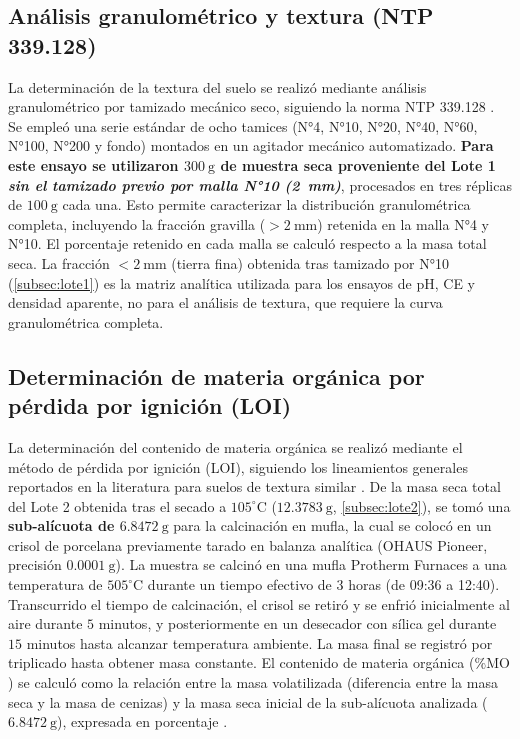 \documentclass[fleqn]{jaes}
\begin{document}
\subsection{Análisis granulométrico y textura (NTP 339.128)}\label{subsec:textura_metodologia}

La determinación de la textura del suelo se realizó mediante análisis granulométrico por tamizado mecánico seco, siguiendo la norma NTP 339.128 \cite{INACAL1999}. Se empleó una serie estándar de ocho tamices (N°4, N°10, N°20, N°40, N°60, N°100, N°200 y fondo) montados en un agitador mecánico automatizado. \textbf{Para este ensayo se utilizaron $300~\text{g}$ de muestra seca proveniente del Lote 1 \textit{sin el tamizado previo por malla N°10 (2~mm)}}, procesados en tres réplicas de $100~\text{g}$ cada una. Esto permite caracterizar la distribución granulométrica completa, incluyendo la fracción gravilla ($>2~\text{mm}$) retenida en la malla N°4 y N°10. El porcentaje retenido en cada malla se calculó respecto a la masa total seca. La fracción $<2~\text{mm}$ (tierra fina) obtenida tras tamizado por N°10 (\cref{subsec:lote1}) es la matriz analítica utilizada para los ensayos de pH, CE y densidad aparente, no para el análisis de textura, que requiere la curva granulométrica completa.

\subsection{Determinación de materia orgánica por pérdida por ignición (LOI)}

La determinación del contenido de materia orgánica se realizó mediante el método de pérdida por ignición (LOI), siguiendo los lineamientos generales reportados en la literatura para suelos de textura similar \cite{Hoogsteen2015, Combs1998}. De la masa seca total del Lote 2 obtenida tras el secado a $105^\circ\text{C}$ ($12.3783~\text{g}$, \cref{subsec:lote2}), se tomó una \textbf{sub-alícuota de $6.8472~\text{g}$} para la calcinación en mufla, la cual se colocó en un crisol de porcelana previamente tarado en balanza analítica (OHAUS Pioneer, precisión $0.0001~\text{g}$). La muestra se calcinó en una mufla Protherm Furnaces a una temperatura de $505^\circ\text{C}$ durante un tiempo efectivo de $3$ horas (de 09:36 a 12:40). Transcurrido el tiempo de calcinación, el crisol se retiró y se enfrió inicialmente al aire durante $5$ minutos, y posteriormente en un desecador con sílica gel durante $15$ minutos hasta alcanzar temperatura ambiente. La masa final se registró por triplicado hasta obtener masa constante. El contenido de materia orgánica ($\%\text{MO}$) se calculó como la relación entre la masa volatilizada (diferencia entre la masa seca y la masa de cenizas) y la masa seca inicial de la sub-alícuota analizada ($6.8472~\text{g}$), expresada en porcentaje \cite{Hoogsteen2015}.
\end{document}
